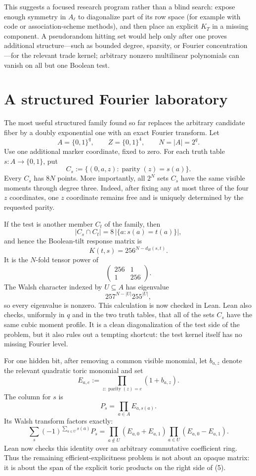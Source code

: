 \documentclass[11pt]{article}
\newcommand{\bits}{\{0,1\}}
\begin{document}
This suggests a focused research program rather than a blind search: expose
enough symmetry in $A_\ell$ to diagonalize part of its row space (for example
with code or association-scheme methods), and then place an explicit $K_T$
in a missing component.  A pseudorandom hitting set would help only after one
proves additional structure---such as bounded degree, sparsity, or Fourier
concentration---for the relevant trade kernel; arbitrary nonzero multilinear
polynomials can vanish on all but one Boolean test.

\section{A structured Fourier laboratory}

The most useful structured family found so far replaces the arbitrary
candidate fiber by a doubly exponential one with an exact Fourier transform.
Let
\[
  A=\bits^q,\qquad Z=\bits^4,\qquad N=|A|=2^q.
\]
Use one additional marker coordinate, fixed to zero.  For each truth table
$s:A\to\bits$, put
\[
  C_s:=\{(0,a,z):\operatorname{parity}(z)=s(a)\}.
\]
Every $C_s$ has $8N$ points.  More importantly, all $2^N$ sets $C_s$ have
the same visible moments through degree three.  Indeed, after fixing any at
most three of the four $z$ coordinates, one $z$ coordinate remains free and
is uniquely determined by the requested parity.

If the test is another member $C_t$ of the family, then
\[
  |C_s\cap C_t|=8\,|\{a:s(a)=t(a)\}|,
\]
and hence the Boolean-tilt response matrix is
\[
  K(t,s)=256^{N-d_H(s,t)}.
\]
It is the $N$-fold tensor power of
\[
  \begin{pmatrix}256&1\\1&256\end{pmatrix}.
\]
The Walsh character indexed by $U\subseteq A$ has eigenvalue
\[
  257^{N-|U|}255^{|U|},
\]
so every eigenvalue is nonzero.  This calculation is now checked in Lean.
Lean also checks, uniformly in $q$ and in the two truth tables, that all of
the sets $C_s$ have the same cubic moment profile.
It is a clean diagonalization of the test side of the problem, but it also
rules out a tempting shortcut: the test kernel itself has no missing Fourier
level.

For one hidden bit, after removing a common visible monomial, let $b_{a,z}$
denote the relevant quadratic toric monomial and set
\[
 E_{a,e}:=\prod_{z:\operatorname{parity}(z)=e}(1+b_{a,z}).
\]
The column for $s$ is
\[
  P_s=\prod_{a\in A}E_{a,s(a)}.
\]
Its Walsh transform factors exactly:
\[
 \sum_s(-1)^{\sum_{a\in U}s(a)}P_s
 =\prod_{a\notin U}(E_{a,0}+E_{a,1})
  \prod_{a\in U}(E_{a,0}-E_{a,1}).              \tag{5}
\]
Lean now checks this identity over an arbitrary commutative coefficient
ring.  Thus the remaining efficient-explicitness problem is not about an
opaque matrix: it is about the span of the explicit toric products on the
right side of (5).
\end{document}
